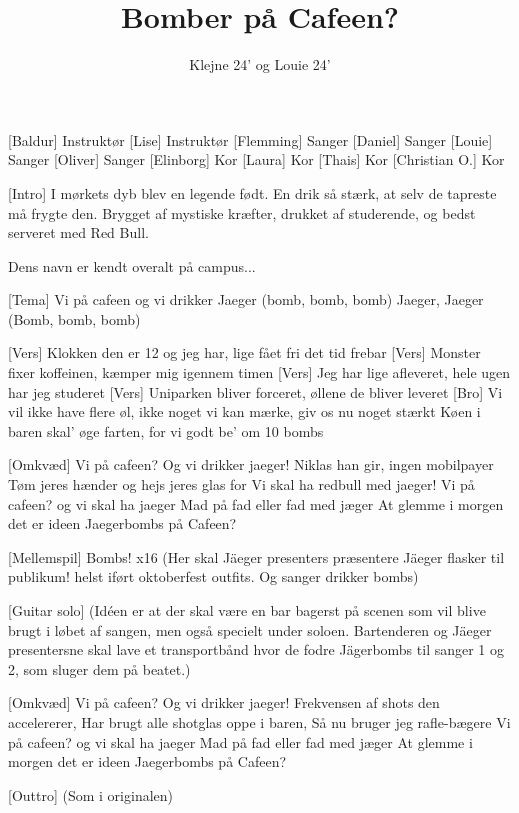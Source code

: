 \documentclass[a4paper,11pt]{article}
\title{Bomber på Cafeen?}
\author{Klejne 24' og Louie 24'}
\begin{document}
\maketitle

\begin{roles}
[Baldur] Instruktør
[Lise] Instruktør
[Flemming] Sanger
[Daniel] Sanger
[Louie] Sanger
[Oliver] Sanger
[Elinborg] Kor
[Laura] Kor
[Thais] Kor
[Christian O.] Kor
\end{roles}

\begin{song}
[Intro]
  I mørkets dyb blev en legende født.
  En drik så stærk, at selv de tapreste må frygte den.
  Brygget af mystiske kræfter, drukket af studerende,
  og bedst serveret med Red Bull.

Dens navn er kendt overalt på campus...

[Tema]
Vi på cafeen og vi drikker Jaeger (bomb, bomb, bomb)
Jaeger, Jaeger (Bomb, bomb, bomb)

[Vers]
Klokken den er 12 og jeg har, lige fået fri det tid frebar
[Vers]
Monster fixer koffeinen, kæmper mig igennem timen
[Vers]
Jeg har lige afleveret, hele ugen har jeg studeret
[Vers]
Uniparken bliver forceret, øllene de bliver leveret
[Bro]
Vi vil ikke have flere øl, ikke noget vi kan mærke, giv os nu noget stærkt
Køen i baren skal’ øge farten, for vi godt be’ om 10 bombs


[Omkvæd]
Vi på cafeen? Og vi drikker jaeger! 
Niklas han gir, ingen mobilpayer
Tøm jeres hænder og hejs jeres glas for
Vi skal ha redbull med jaeger!
Vi på cafeen? og vi skal ha jaeger
Mad på fad eller fad med jæger
At glemme i morgen det er ideen
Jaegerbombs på Cafeen?

[Mellemspil]
Bombs! x16
(Her skal Jäeger presenters præsentere Jäeger flasker til publikum! helst iført oktoberfest outfits. Og sanger drikker bombs)

[Guitar solo]
(Idéen er at der skal være en bar bagerst på scenen som vil blive brugt i løbet af sangen, men også specielt under soloen. Bartenderen og Jäeger presentersne skal lave et transportbånd hvor de fodre Jägerbombs til sanger 1 og 2, som sluger dem på beatet.)

[Omkvæd]
Vi på cafeen? Og vi drikker jaeger! 
Frekvensen af shots den accelererer,
Har brugt alle shotglas oppe i baren,
Så nu bruger jeg rafle-bægere
Vi på cafeen? og vi skal ha jaeger
Mad på fad eller fad med jæger
At glemme i morgen det er ideen
Jaegerbombs på Cafeen?

\sings{}[Outtro]
(Som i originalen)
\end{song}
\end{document}

